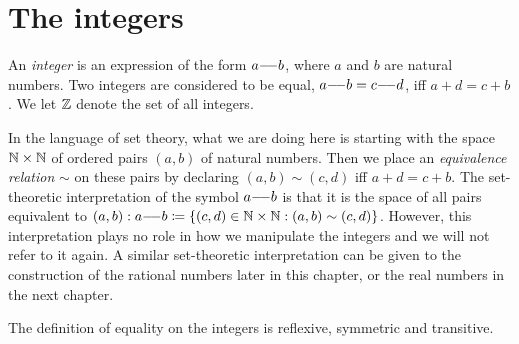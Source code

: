 \section{The integers}\label{i:sec:4.1}

\begin{defn}[Integers]\label{i:4.1.1}
  An \emph{integer} is an expression of the form \(a {-}\!{-} b\), where \(a\) and \(b\) are natural numbers.
  Two integers are considered to be equal, \(a {-}\!{-} b = c {-}\!{-} d\), iff \(a + d = c + b\).
  We let \(\mathbb{Z}\) denote the set of all integers.
\end{defn}

\begin{note}
  In the language of set theory, what we are doing here is starting with the space \(\mathbb{N} \times \mathbb{N}\) of ordered pairs \((a, b)\) of natural numbers.
  Then we place an \emph{equivalence relation} \(\sim\) on these pairs by declaring \((a, b) \sim (c, d)\) iff \(a + d = c + b\).
  The set-theoretic interpretation of the symbol \(a {-}\!{-} b\) is that it is the space of all pairs equivalent to \((a, b): a {-}\!{-} b \coloneqq \left\lbrace(c, d) \in \mathbb{N} \times \mathbb{N} : (a, b) \sim (c, d)\right\rbrace\).
  However, this interpretation plays no role in how we manipulate the integers and we will not refer to it again.
  A similar set-theoretic interpretation can be given to the construction of the rational numbers later in this chapter, or the real numbers in the next chapter.
\end{note}

\begin{ac}\label{i:ac:4.1.1}
  The definition of equality on the integers is reflexive, symmetric and transitive.
\end{ac}

